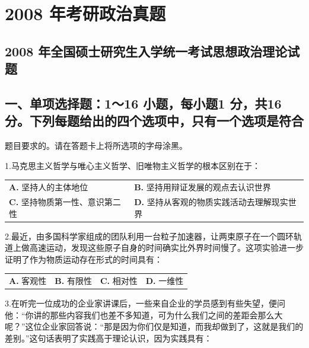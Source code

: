 \documentclass[UTF8,11pt]{ctexart}
\begin{document}
\section*{2008 年考研政治真题}
\subsection*{2008 年全国硕士研究生入学统一考试思想政治理论试题}

\subsection*{一、单项选择题：1～16 小题，每小题1 分，共16 分。下列每题给出的四个选项中，只有一个选项是符合}

题目要求的。请在答题卡上将所选项的字母涂黑。


1.马克思主义哲学与唯心主义哲学、旧唯物主义哲学的根本区别在于：


\begin{center}\begin{tabular}{>{\raggedright\arraybackslash}p{\dimexpr(\linewidth-4\tabcolsep)/2\relax}>{\raggedright\arraybackslash}p{\dimexpr(\linewidth-4\tabcolsep)/2\relax}}
\textbf{A.} 坚持人的主体地位 & \textbf{B.} 坚持用辩证发展的观点去认识世界\\[.35em]
\textbf{C.} 坚持物质第一性、意识第二性 & \textbf{D.} 坚持从客观的物质实践活动去理解现实世界\\[.35em]\end{tabular}\end{center}

2.最近，由多国科学家组成的团队利用一台粒子加速器，让两束原子在一个圆环轨道上做高速运动，发现这些原子自身的时间确实比外界时间慢了。这项实验进一步证明了作为物质运动存在形式的时间具有：


\begin{center}\begin{tabular}{>{\raggedright\arraybackslash}p{\dimexpr(\linewidth-8\tabcolsep)/4\relax}>{\raggedright\arraybackslash}p{\dimexpr(\linewidth-8\tabcolsep)/4\relax}>{\raggedright\arraybackslash}p{\dimexpr(\linewidth-8\tabcolsep)/4\relax}>{\raggedright\arraybackslash}p{\dimexpr(\linewidth-8\tabcolsep)/4\relax}}
\textbf{A.} 客观性 & \textbf{B.} 有限性 & \textbf{C.} 相对性 & \textbf{D.} 一维性\\[.35em]\end{tabular}\end{center}

3.在听完一位成功的企业家讲课后，一些来自企业的学员感到有些失望，便问他：“你讲的那些内容我们也差不多知道，可为什么我们之间的差距会那么大呢？”这位企业家回答说：“那是因为你们仅是知道，而我却做到了，这就是我们的差别。”这句话表明了实践高于理论认识，因为实践具有：
\end{document}
